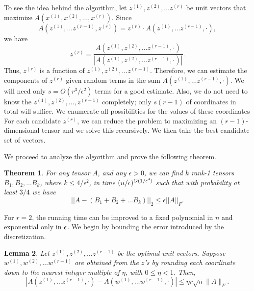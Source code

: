 \documentclass{book}
\newtheorem{theorem}{Theorem}[chapter]
\newtheorem{lemma}[theorem]{Lemma}
\numberwithin{exercise}{chapter}
\begin{document}
To see the idea behind the algorithm, let
$z^{(1)},z^{(2)},\ldots z^{(r)}$ be unit vectors
that maximize $A(x^{(1)},x^{(2)},\ldots,x^{(r)})$.
Since
\[
A(z^{(1)},\ldots z^{(r-1)},z^{(r)})=
z^{(r)}\cdot A(z^{(1)},\ldots z^{(r-1)},\cdot ),
\]
we have
\[
z^{(r)}=\frac{A(z^{(1)},z^{(2)},\ldots z^{(r-1)},\cdot )}
{|A(z^{(1)},z^{(2)},\ldots z^{(r-1)},\cdot )|}.
\]
Thus, $z^{(r)}$ is a function of $z^{(1)},z^{(2)},\ldots z^{(r-1)}$.
Therefore, we can estimate
the components of $z^{(r)}$ given random terms
in the sum $A(z^{(1)},\ldots z^{(r-1)},\cdot )$.
We will need only $s=O(r^3/\epsilon^2)$
terms for a good estimate.
Also, we do not need to know the
 $z^{(1)},z^{(2)},\ldots, z^{(r-1)}$ completely; only $s(r-1)$ of
coordinates in total will suffice. We
enumerate all possibilities for the values of these coordinates
For each candidate $z^{(r)}$, we can reduce the problem
to maximizing an $(r-1)$-dimensional tensor and we solve this
recursively. We then take the best candidate set of vectors.

We proceed to analyze the algorithm and prove the following theorem.

\begin{theorem}\label{thm:FastTensor}
For any tensor $A$, and any $\epsilon >0$, we can find $k$
rank-1 tensors $B_1,B_2,\ldots B_k$, where $k\leq 4/\epsilon^2$,
in time $(n/\epsilon)^{O(1/\epsilon^4)}$
such that with probability at least $3/4$
we have
$$||A-(B_1+B_2+\ldots B_k)||_2\leq \epsilon ||A||_F.$$
\end{theorem}

For $r=2$, the running time can be improved to a fixed polynomial in $n$ and exponential only in $\epsilon$.
We begin by bounding the error introduced by the discretization.

\begin{lemma}
Let $z^{(1)},z^{(2)},\ldots z^{(r-1)}$ be the optimal
unit vectors. Suppose $w^{(1)},w^{(2)},\ldots w^{(r-1)}$ are obtained
from the $z$'s by rounding each coordinate down to the
nearest integer multiple of $\eta $, with $0 \le \eta < 1$. Then,
\[
\left| A(z^{(1)},\ldots z^{(r-1)},\cdot ) -
A(w^{(1)},\ldots w^{(r-1)},\cdot )\right|
\leq \eta r \sqrt{n}\|A\|_F.
\]
\end{lemma}
\end{document}
